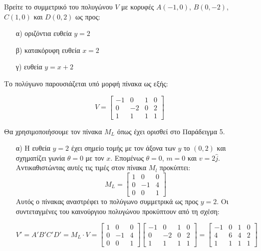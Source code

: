 \begin{example}
 Βρείτε το συμμετρικό του πολυγώνου $V$ με κορυφές $A(-1, 0)$, $B(0, -2)$, $C(1, 0)$ και $D(0, 2)$ ως προς:
\begin{enumerate}
    \item[α)] οριζόντια ευθεία $y=2$
    \item[β)] κατακόρυφη ευθεία $x=2$
    \item[γ)] ευθεία $y=x+2$
\end{enumerate}
\end{example}


\begin{solution}
Το πολύγωνο παρουσιάζεται υπό μορφή πίνακα ως εξής:

\[
V = \begin{bmatrix}
-1 & 0 & 1 & 0 \\
0 & -2 & 0 & 2 \\
1 & 1 & 1 & 1
\end{bmatrix}
\]

Θα χρησιμοποιήσουμε τον πίνακα $M_L$ όπως έχει ορισθεί στο Παράδειγμα 5.
\begin{enumerate}
    \item[α)] Η ευθεία $y=2$ έχει σημείο τομής με τον άξονα των $y$ το $(0,2)$ και σχηματίζει γωνία $\theta = 0$ με τον $x$. Επομένως $\theta=0$, $m=0$ και $v=2\hat{j}$. Αντικαθιστώντας αυτές τις τιμές στον πίνακα $M_l$ προκύπτει:
    \[
    M_L = \begin{bmatrix}
    1 & 0 & 0 \\
    0 & -1 & 4 \\
    0 & 0 & 1
    \end{bmatrix}
    \]
Αυτός ο πίνακας αναστρέφει το πολύγωνο συμμετρικά ως προς $y=2$.
Οι συντεταγμένες του καινούργιου πολυγώνου προκύπτουν από τη σχέση:

\[
V' = A'B'C'D' = M_L \cdot V = \begin{bmatrix}
1 & 0 & 0 \\
0 & -1 & 4 \\
0 & 0 & 1
\end{bmatrix}
\begin{bmatrix}
-1 & 0 & 1 & 0 \\
0 & -2 & 0 & 2 \\
1 & 1 & 1 & 1
\end{bmatrix}
= \begin{bmatrix}
-1 & 0 & 1 & 0 \\
4 & 6 & 4 & 2 \\
1 & 1 & 1 & 1
\end{bmatrix}
\]


\end{enumerate}
\end{solution}
